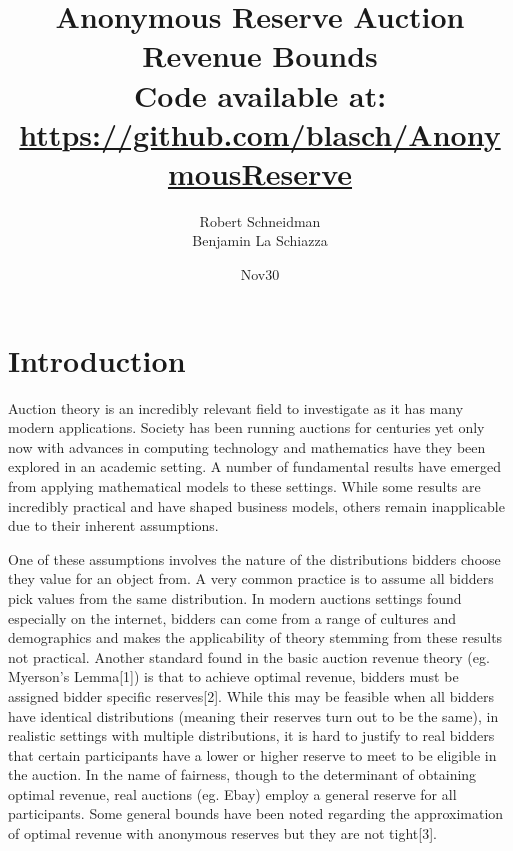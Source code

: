 \documentclass{acm_proc_article-sp}
\begin{document}
\title{Anonymous Reserve Auction Revenue Bounds \\
{\normalsize Code available at: \url{https://github.com/blasch/AnonymousReserve}}} 
\subtitle{}

\author{
\alignauthor 
Robert Schneidman \\
\alignauthor Benjamin La Schiazza\\
}

\date{Nov30}

\maketitle
\begin{abstract}

\end{abstract}

\section{Introduction}
Auction theory is an incredibly relevant field to investigate as it has many modern applications. Society has been running auctions for centuries yet only now with advances in computing technology and mathematics have they been explored in an academic setting. A number of fundamental results have emerged from applying mathematical models to these settings. While some results are incredibly practical and have shaped business models, others remain inapplicable due to their inherent assumptions. 

One of these assumptions involves the nature of the distributions bidders choose they value for an object from. A very common practice is to assume all bidders pick values from the same distribution. In modern auctions settings found especially on the internet, bidders can come from a range of cultures and demographics and makes the applicability of theory stemming from these results not practical. Another standard found in the basic auction revenue theory (eg. Myerson's Lemma[1]) is that to achieve optimal revenue, bidders must be assigned bidder specific reserves[2]. While this may be feasible when all bidders have identical distributions (meaning their reserves turn out to be the same), in realistic settings with multiple distributions, it is hard to justify to real bidders that certain participants have a lower or higher reserve to meet to be eligible in the auction. In the name of fairness, though to the determinant of obtaining optimal revenue, real auctions (eg. Ebay) employ a general reserve for all participants. Some general bounds have been noted regarding the approximation of optimal revenue with anonymous reserves but they are not tight[3]. 
\end{document}
